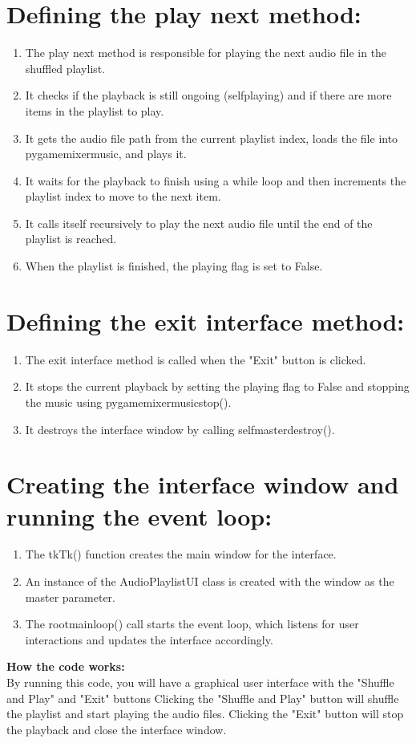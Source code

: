 \documentclass[12pt,onecolumn,notitlepage]{article}
\begin{document}
 \section*{Defining the play next method:}
\begin{enumerate}
  \setlength\itemsep{0pt}
  \item     The play next method is responsible for playing the next audio file in the shuffled playlist.
    \item It checks if the playback is still ongoing (selfplaying) and if there are more items in the playlist to play.
    \item It gets the audio file path from the current playlist index, loads the file into pygamemixermusic, and plays it.
    \item It waits for the playback to finish using a while loop and then increments the playlist index to move to the next item.
    \item It calls itself recursively to play the next audio file until the end of the playlist is reached.
    \item When the playlist is finished, the playing flag is set to False.


\end{enumerate} 
 \section*{Defining the exit interface method:}
\begin{enumerate}
  \setlength\itemsep{0pt}
  \item     The exit interface method is called when the "Exit" button is clicked.
   \item  It stops the current playback by setting the playing flag to False and stopping the music using pygamemixermusicstop().
    \item It destroys the interface window by calling selfmasterdestroy().
\end{enumerate} 
\section*{Creating the interface window and running the event loop:}
\begin{enumerate}
  \setlength\itemsep{0pt}
  \item     The tkTk() function creates the main window for the interface.
   \item  An instance of the AudioPlaylistUI class is created with the window as the master parameter.
    \item The rootmainloop() call starts the event loop, which listens for user interactions and updates the interface accordingly.
\end{enumerate} 
\textbf{\LARGE{How the code works:}}\\
 \large{By running this code, you will have a graphical user interface with the "Shuffle and Play" and "Exit" buttons Clicking the "Shuffle and Play" button will shuffle the playlist and start playing the audio files. Clicking the "Exit" button will stop the playback and close the interface window.}\\
 
\end{document}
